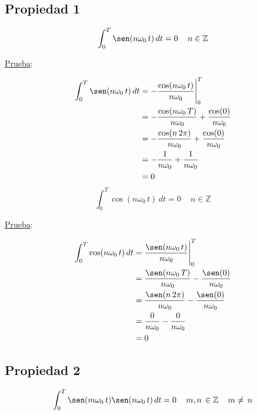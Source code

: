 \subsection*{Propiedad 1}
\begin{equation}
    \int_{0}^{T}\sen(n\omega_0\,t)\,dt=0\quad\,n\in\mathbb{Z}
\end{equation}

\underline{Prueba}:

\begin{equation*}
\begin{split}
    \int_{0}^{T}\sen(n\omega_0\,t)\,dt
        &=-\frac{\cos(n\omega_0\,t)}{n\omega_0}\Biggr|_{0}^{T}\\
        &=-\frac{\cos(n\omega_0\,T)}{n\omega_0}+\frac{\cos(0)}{n\omega_0}\\
        &=-\frac{\cos(n\,2\pi)}{n\omega_0}+\frac{\cos(0)}{n\omega_0}\\
        &=-\frac{1}{n\omega_0}+\frac{1}{n\omega_0}\\
        &=0\\
\end{split}
\end{equation*}
\begin{equation}
    \int_{0}^{T}\cos(n\omega_0\,t)\,dt=0\quad\,n\in\mathbb{Z}
\end{equation}

\underline{Prueba}:

\begin{equation*}
\begin{split}
    \int_{0}^{T}\cos(n\omega_0\,t)\,dt
        &=\frac{\sen(n\omega_0\,t)}{n\omega_0}\Biggr|_{0}^{T}\\
        &=\frac{\sen(n\omega_0\,T)}{n\omega_0}-\frac{\sen(0)}{n\omega_0}\\
        &=\frac{\sen(n\,2\pi)}{n\omega_0}-\frac{\sen(0)}{n\omega_0}\\
        &=\frac{0}{n\omega_0}-\frac{0}{n\omega_0}\\
        &=0\\
\end{split}
\end{equation*}

\subsection*{Propiedad 2}
\begin{equation}
    \int_{0}^{T}\sen(m\omega_0\,t)\sen(n\omega_0\,t)\,dt=0
    \quad\,m,n\,\in\mathbb{Z}\quad\,m\neq\,n
\end{equation}

